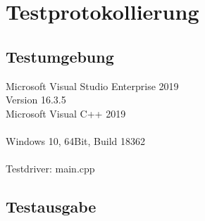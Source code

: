 





\newpage
\section{Testprotokollierung}


\subsection{Testumgebung}

Microsoft Visual Studio Enterprise 2019\\
Version 16.3.5\\
Microsoft Visual C++ 2019\\
\\
Windows 10, 64Bit, Build 18362\\
\\
Testdriver: main.cpp

\subsection{Testausgabe}


